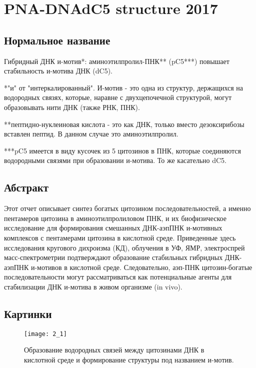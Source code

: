 \section{PNA-DNAdC5 structure 2017}

\subsection{Нормальное название}

Гибридный ДНК и-мотив*: аминоэтилпролил-ПНК** (pC5***) повышает стабильность и-мотива ДНК (dC5).

*"и" от "интеркалированный". И-мотив - это одна из структур, держащихся на водородных связях, которые, наравне с двухцепочечной структурой, могут образовывать нити ДНК (также РНК, ПНК).

**пептидно-нуклеиновая кислота - это как ДНК, только вместо дезоксирибозы вставлен пептид. В данном случае это аминоэтилпролил.

***pC5 имеется в виду кусочек из 5 цитозинов в ПНК, которые соединяются водородными связями при образовании и-мотива. То же касательно dC5.

\subsection{Абстракт}

Этот отчет описывает синтез богатых цитозином последовательностей, а именно пентамеров цитозина в аминоэтилпролиловом ПНК, и их биофизическое исследование для формирования смешанных ДНК-аэпПНК и-мотивных комплексов с пентамерами цитозина в кислотной среде.  Приведенные здесь исследования кругового дихроизма (КД), облучения в УФ, ЯМР, электроспрей масс-спектрометрии подтверждают образование стабильных гибридных ДНК-аэпПНК и-мотивов в кислотной среде. Следовательно, аэп-ПНК цитозин-богатые последовательности могут рассматриваться как потенциальные агенты для стабилизации ДНК и-мотива в живом организме (in vivo).

\subsection{Картинки}

\begin{figure}[H]
	\centering
	\texttt{[image: 2\_1]}
	\caption{Образование водородных связей между цитозинами ДНК в кислотной среде и формирование структуры под названием и-мотив.}
	\label{fig:2_1}
\end{figure}

